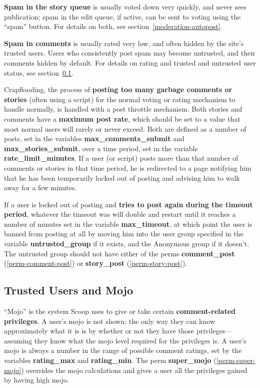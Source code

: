 {\bf Spam in the story queue} is usually voted down very quickly, and never sees publication; spam in the edit queue, if active, can be sent to voting using the ``spam'' button.  For details on both, see section~\ref{moderation-autopost}.

{\bf Spam in comments} is usually rated very low, and often hidden by the site's trusted users.  Users who consistently post spam may become untrusted, and their comments hidden by default.  For details on rating and trusted and untrusted user status, see section~\ref{features-mojo}.

Crapflooding, the process of {\bf posting too many garbage comments or stories} (often using a script) for the normal voting or rating mechanism to handle normally, is handled with a post throttle mechanism.  Both stories and comments have a {\bf maximum post rate}, which should be set to a value that most normal users will rarely or never exceed.  Both are defined as a number of posts, set in the variables {\bf max\_comments\_submit} and {\bf max\_stories\_submit}, over a time period, set in the variable {\bf rate\_limit\_minutes}.  If a user (or script) posts more than that number of comments or stories in that time period, he is redirected to a page notifying him that he has been temporarily locked out of posting and advising him to walk away for a few minutes.

If a user is locked out of posting and {\bf tries to post again during the timeout period}, whatever the timeout was will double and restart until it reaches a number of minutes set in the variable {\bf max\_timeout}, at which point the user is banned from posting at all by moving him into the user group specified in the variable {\bf untrusted\_group} if it exists, and the Anonymous group if it doesn't.  The untrusted group should not have either of the perms {\bf comment\_post} (\ref{perm-comment-post}) or {\bf story\_post} (\ref{perm-story-post}).

\subsection{Trusted Users and Mojo}
\label{features-mojo}

``Mojo'' is the system Scoop uses to give or take certain {\bf comment-related privileges}.  A user's mojo is not shown; the only way they can know approximately what it is is by whether or not they have those privileges---assuming they know what the mojo level required for the privileges is.  A user's mojo is always a number in the range of possible comment ratings, set by the variables {\bf rating\_max} and {\bf rating\_min}.  The perm {\bf super\_mojo} (\ref{perm-super-mojo}) overrides the mojo calculations and gives a user all the privileges gained by having high mojo.

